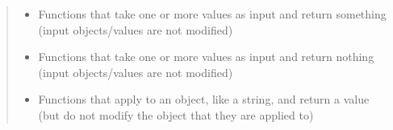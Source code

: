 \documentclass[letterpaper,10pt,english]{sphinxmanual}
\begin{document}
\begin{quote}
\begin{itemize}
\item {} 
Functions that take one or more values as input and return
something (input objects/values are not modified)

\end{itemize}
\begin{quote}

%
\begin{sphinxVerbatim}[commandchars=\\\{\}]
  
\end{sphinxVerbatim}
\end{quote}
\begin{itemize}
\item {} 
Functions that take one or more values as input and return
nothing (input objects/values are not modified)

\end{itemize}
\begin{quote}

%
\begin{sphinxVerbatim}[commandchars=\\\{\}]
  
      
  
  
 
\end{sphinxVerbatim}
\end{quote}
\begin{itemize}
\item {} 
Functions that apply to an object, like a string, and return a
value (but do not modify the object that they are applied to)


\end{itemize}
\end{quote}
\end{document}

